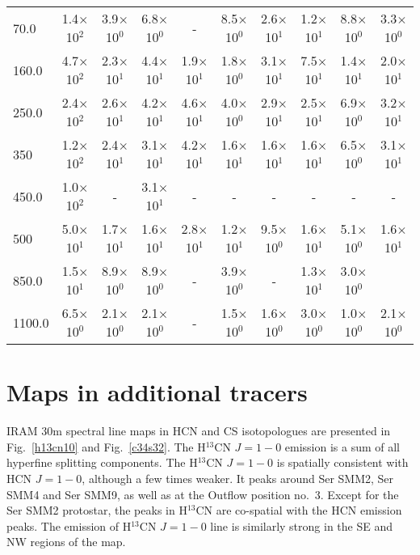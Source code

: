 \documentclass{aa}
\begin{document}
\begin{appendix}
\begin{table*}
\begin{tabular}{l c c c c c c c c c}
70.0 & 1.4$\times$10$^{2}$ & 3.9$\times$10$^{0}$ & 6.8$\times$10$^{0}$ & - & 8.5$\times$10$^{0}$ & 2.6$\times$10$^{1}$ & 1.2$\times$10$^{1}$ & 8.8$\times$10$^{0}$ & 3.3$\times$10$^{0}$\\
160.0 & 4.7$\times$10$^{2}$ & 2.3$\times$10$^{1}$ & 4.4$\times$10$^{1}$ & 1.9$\times$10$^{1}$ & 1.8$\times$10$^{0}$ & 3.1$\times$10$^{1}$ & 7.5$\times$10$^{1}$ & 1.4$\times$10$^{1}$ & 2.0$\times$10$^{1}$\\
250.0 &  2.4$\times$10$^{2}$ & 2.6$\times$10$^{1}$ & 4.2$\times$10$^{1}$ & 4.6$\times$10$^{1}$ & 4.0$\times$10$^{0}$ & 2.9$\times$10$^{1}$ & 2.5$\times$10$^{1}$ & 6.9$\times$10$^{0}$ & 3.2$\times$10$^{1}$\\
350 & 1.2$\times$10$^{2}$ & 2.4$\times$10$^{1}$ & 3.1$\times$10$^{1}$ & 4.2$\times$10$^{1}$ & 1.6$\times$10$^{1}$ & 1.6$\times$10$^{1}$ & 1.6$\times$10$^{1}$ & 6.5$\times$10$^{0}$ & 3.1$\times$10$^{1}$\\
450.0 & 1.0$\times$10$^{2}$ &-  & 3.1$\times$10$^{1}$ &- &- &- &- &- &-\\
500 & 5.0$\times$10$^{1}$ & 1.7$\times$10$^{1}$ & 1.6$\times$10$^{1}$ & 2.8$\times$10$^{1}$ & 1.2$\times$10$^{1}$ & 9.5$\times$10$^{0}$ & 1.6$\times$10$^{1}$ & 5.1$\times$10$^{0}$ & 1.6$\times$10$^{1}$\\
850.0 & 1.5$\times$10$^{1}$ & 8.9$\times$10$^{0}$ & 8.9$\times$10$^{0}$ & - & 3.9$\times$10$^{0}$ & - & 1.3$\times$10$^{1}$ & 3.0$\times$10$^{0}$ &\\
1100.0 & 6.5$\times$10$^{0}$ & 2.1$\times$10$^{0}$ & 2.1$\times$10$^{0}$ & - & 1.5$\times$10$^{0}$ & 1.6$\times$10$^{0}$ & 3.0$\times$10$^{0}$ & 1.0$\times$10$^{0}$ & 2.1$\times$10$^{0}$\\
\hline \end{tabular} 
\end{table*}

\section{Maps in additional tracers}

IRAM 30m spectral line maps in HCN and CS isotopologues are presented in Fig.~\ref{h13cn10} and Fig.~\ref{c34s32}. The H$^{13}$CN $J=1-0$ emission is a sum of all hyperfine splitting components. The H$^{13}$CN $J=1-0$ is spatially consistent with HCN $J=1-0$, although a few times weaker. It peaks around Ser SMM2, Ser SMM4 and Ser SMM9, as well as at the Outflow position no.~3. Except for the Ser SMM2 protostar, the peaks in H$^{13}$CN are co-spatial with the HCN emission peaks. The emission of H$^{13}$CN $J=1-0$ line is similarly strong in the SE and NW regions of the map.


\end{appendix}
\end{document}
